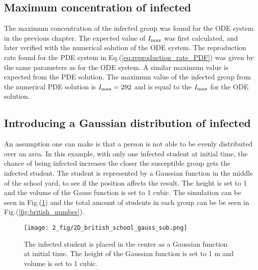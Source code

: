 \documentclass[%
twoside,                 %
final,                   %
chapterprefix=true,      %
open=right               %
10pt]{book}
\begin{document}
\subsection{Maximum concentration of infected}
The maximum concentration of the infected group was found for the ODE system in the previous chapter. The expected value of $I_{\textrm{max}}$ was first calculated, and later verified with the numerical solution of the ODE system. The reproduction rate found for the PDE system in Eq.(\ref{eq:reproduction_rate_PDF}) was given by the same parameters as for the ODE system. A similar maximum value is expected from the PDE solution. The maximum value of the infected group from the numerical PDE solution is $I_{\textrm{max}}=292$ and is equal to the $I_{\textrm{max}}$ for the ODE solution. 


\subsection{Introducing a Gaussian distribution of infected}
An assumption one can make is that a person is not able to be evenly distributed over an area. In this example, with only one infected student at initial time, the chance of being infected increases the closer the susceptible group gets the infected student. The student is represented by a Gaussian function in the middle of the school yard, to see if the position affects the result. The height is set to 1 and the volume of the Gauss function is set to 1 cubic. The simulation can be seen in Fig.(\ref{fig:gauss_sub}) and the total amount of students in each group can be be seen in Fig.(\ref{fig:british_number}).


\begin{figure}[ht]
  \centerline{\texttt{[image: 2\_fig/2D\_british\_school\_gauss\_sub.png]}}
  \caption{
  \label{fig:gauss_sub} The infected student is placed in the center as a Gaussian function at initial time. The height of the Gaussian function is set to 1 m and volume is set to 1 cubic.
  }
\end{figure}




\vspace{3mm}




\vspace{3mm}
\end{document}
